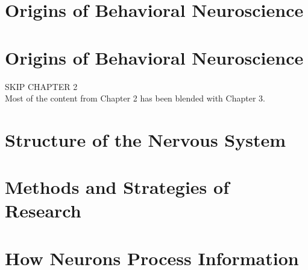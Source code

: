 \documentclass[12pt, oneside]{book}
\begin{document}

\setcounter{chapter}{0}
\chapter{Origins of Behavioral Neuroscience}
\vspace*{-0.25in}

\setcounter{chapter}{0}
\chapter{Origins of Behavioral Neuroscience}
\vspace*{-0.25in}


% 
\newpage
{}
\fancyhead[R]{}

\begin{center}
    \textsc{SKIP CHAPTER 2} \\
    Most of the content from Chapter 2 has been blended with Chapter 3. \\
\end{center}
\newpage
\fancyhead[R]{\leftmark}

\setcounter{chapter}{2}
\chapter{Structure of the Nervous System}
\vspace*{-0.25in}


\setcounter{chapter}{4}
\chapter{Methods and Strategies of Research}
\vspace*{-0.25in}


\setcounter{chapter}{5}
\chapter{How Neurons Process Information}
\vspace*{-0.25in}

\end{document}
